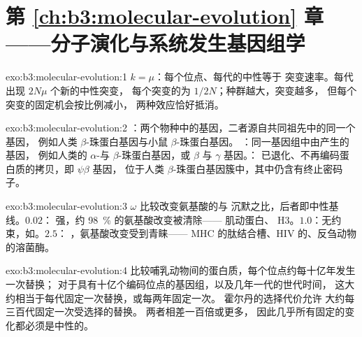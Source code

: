 \section*{第 \ref{ch:b3:molecular-evolution} 章——分子演化与系统发生基因组学}

\begin{solution}{exo:b3:molecular-evolution:1}
$k = \mu$：每个位点、每代的中性等于
突变速率。每代出现 $2N\mu$ 个新的中性突变，
每个突变的为 $1/2N$；种群越大，突变越多，
但每个突变的固定机会按比例减小，
两种效应恰好抵消。
\end{solution}

\begin{solution}{exo:b3:molecular-evolution:2}
：两个物种中的基因，二者源自共同祖先中的同一个基因，
例如人类 $\beta$-珠蛋白基因与小鼠 $\beta$-珠蛋白基因。
：同一基因组中由产生的基因，
例如人类的 $\alpha$-与 $\beta$-珠蛋白基因，或 $\beta$ 与 $\gamma$ 基因。：
已退化、不再编码蛋白质的拷贝，即 $\psi\beta$ 基因，
位于人类 $\beta$-珠蛋白基因簇中，其中仍含有终止密码子。
\end{solution}

\begin{solution}{exo:b3:molecular-evolution:3}
$\omega$ 比较改变氨基酸的与
沉默之比，后者即中性基线。$0.02$：
强，约 \qty{98}{\%} 的氨基酸改变被清除——
肌动蛋白、 H3。$1.0$：无约束，如。$2.5$：
，氨基酸改变受到青睐——
MHC 的肽结合槽、HIV 的、反刍动物的溶菌酶。
\end{solution}

\begin{solution}{exo:b3:molecular-evolution:4}
比较哺乳动物间的蛋白质，每个位点约每十亿年发生一次替换；
对于具有十亿个编码位点的基因组，以及几年一代的世代时间，
这大约相当于每代固定一次替换，或每两年固定一次。
霍尔丹的选择代价允许
大约每三百代固定一次受选择的替换。
两者相差一百倍或更多，
因此几乎所有固定的变化都必须是中性的。
\end{solution}

